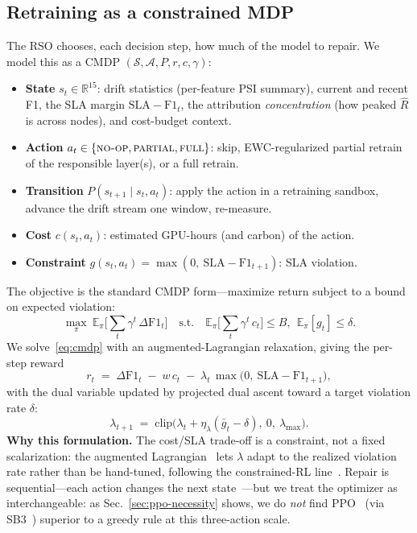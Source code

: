 \documentclass[conference]{IEEEtran}
\begin{document}
\subsection{Retraining as a constrained MDP}
The RSO chooses, each decision step, how much of the model to repair. We
model this as a CMDP $(\mathcal{S},\mathcal{A},P,r,c,\gamma)$:
\begin{itemize}
\item \textbf{State} $s_t\in\mathbb{R}^{15}$: drift statistics (per-feature
PSI summary), current and recent F1, the SLA margin $\mathrm{SLA}-\mathrm{F1}_t$,
the attribution \emph{concentration} (how peaked $\hat R$ is across nodes),
and cost-budget context.
\item \textbf{Action} $a_t\in\{\textsc{no-op},\textsc{partial},\textsc{full}\}$:
skip, EWC-regularized partial retrain of the responsible layer(s), or a
full retrain.
\item \textbf{Transition} $P(s_{t+1}\mid s_t,a_t)$: apply the action in a
retraining sandbox, advance the drift stream one window, re-measure.
\item \textbf{Cost} $c(s_t,a_t)$: estimated GPU-hours (and carbon) of the
action.
\item \textbf{Constraint} $g(s_t,a_t)=\max(0,\ \mathrm{SLA}-\mathrm{F1}_{t+1})$:
SLA violation.
\end{itemize}
The objective is the standard CMDP form---maximize return subject to a
bound on expected violation:
\begin{equation}
\max_{\pi}\ \mathbb{E}_\pi\!\Big[\textstyle\sum_t \gamma^t\,\Delta \mathrm{F1}_t\Big]
\quad\text{s.t.}\quad \mathbb{E}_\pi\!\Big[\textstyle\sum_t \gamma^t\,c_t\Big]\le B,\ \ \mathbb{E}_\pi[g_t]\le \delta .
\label{eq:cmdp}
\end{equation}
We solve~\eqref{eq:cmdp} with an augmented-Lagrangian relaxation, giving
the per-step reward
\begin{equation}
r_t \;=\; \Delta \mathrm{F1}_t \;-\; w\,c_t \;-\; \lambda_t\,\max\!\big(0,\ \mathrm{SLA}-\mathrm{F1}_{t+1}\big),
\label{eq:reward}
\end{equation}
with the dual variable updated by projected dual ascent toward a target
violation rate $\delta$:
\begin{equation}
\lambda_{t+1} \;=\; \mathrm{clip}\big(\lambda_t + \eta_\lambda(\bar g_t - \delta),\ 0,\ \lambda_{\max}\big).
\label{eq:dual}
\end{equation}
\textbf{Why this formulation.} The cost/SLA trade-off is a constraint, not a
fixed scalarization: the augmented Lagrangian~\cite{bertsekas1996constrained}
lets $\lambda$ adapt to the realized violation rate rather than be hand-tuned,
following the constrained-RL
line~\cite{altman1999constrained,achiam2017cpo,tessler2019rcpo,chow2018lyapunov,ray2019safetygym}.
Repair is sequential---each action changes the next
state~\cite{sutton2018reinforcement}---but we treat the optimizer as
interchangeable: as Sec.~\ref{sec:ppo-necessity} shows, we do \emph{not} find
PPO~\cite{schulman2017ppo,schulman2016gae} (via SB3~\cite{raffin2021sb3})
superior to a greedy rule at this three-action scale.
\end{document}
